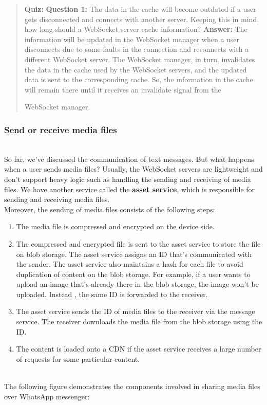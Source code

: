 \begin{quote}
\textbf{Quiz:}
\textbf{Question 1:} The data in the cache will become outdated if a user gets disconnected and connects with another server. Keeping this in mind, how long should a WebSocket server cache information?
\textbf{Answer:} The information will be updated in the WebSocket manager when a user disconnects due to some faults in the connection and reconnects with a different WebSocket server. The WebSocket manager, in turn, invalidates the data in the cache used by the WebSocket servers, and the updated data is sent to the corresponding cache. So, the information in the cache will remain there until it receives an invalidate signal from the

WebSocket manager.
\end{quote}

\subsubsection{Send or receive media files}\label{IYcZ4dhApBmJUiHtg_SYZ}
\\
So far, we've discussed the communication of text messages. But what happens when a user sends media files? Usually, the WebSocket servers are lightweight and don't support heavy logic such as handling the sending and receiving of media files. We have another service called the \textbf{asset service}, which is responsible for sending and receiving media files.
\\
Moreover, the sending of media files consists of the following steps:

\begin{enumerate}
\item
\protect{}\label{4uS_B_80wzSlJExzbqzF5}
The media file is compressed and encrypted on the device side.
\item
\protect{}\label{hBQd4y31eId1uWdVba0Fl}
The compressed and encrypted file is sent to the asset service to store the file on blob storage. The asset service assigns an ID that's communicated with the sender. The asset service also maintains a hash for each file to avoid duplication of content on the blob storage. For example, if a user wants to upload an image that's already there in the blob storage, the image won't be uploaded. Instead , the same ID is forwarded to the receiver.
\item
\protect{}\label{JQnW4AxD4TRkM95QHdXSD}
The asset service sends the ID of media files to the receiver via the message service. The receiver downloads the media file from the blob storage using the ID.
\item
\protect{}\label{3LhSIpjDFkL1UvZ52bbww}
The content is loaded onto a CDN if the asset service receives a large number of requests for some particular content.
\end{enumerate}
\\
The following figure demonstrates the components involved in sharing media files over WhatsApp messenger:

